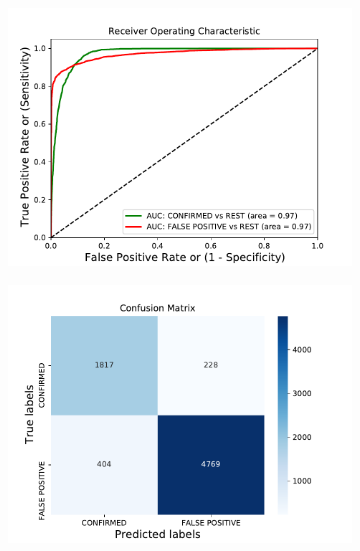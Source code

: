 \begin{figure}[H]
                \centering
                \begin{subfigure}{.49\textwidth}
                \includegraphics[width = 1\textwidth]{data/bLR_vif_overfit_roc.pdf}
                \end{subfigure}
                \begin{subfigure}{.49\textwidth}
                \includegraphics[width = 1\textwidth]{data/bLR_vif_overfit_cm.pdf}
                \end{subfigure}
                \begin{subfigure}{.49\textwidth}

\end{subfigure}
\end{figure}
